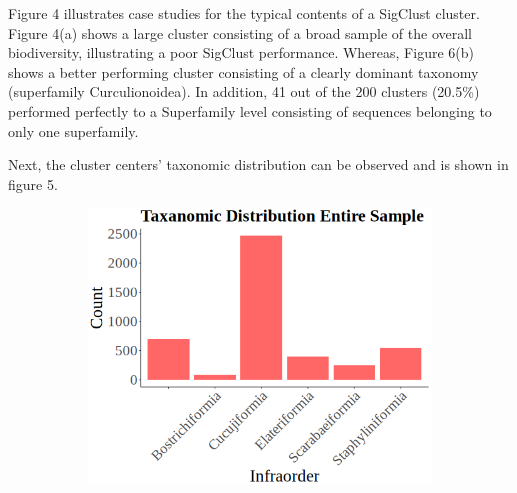 \documentclass[12pt]{article}
\begin{document}
  Figure 4 illustrates case studies for the typical contents of a SigClust cluster. Figure 4(a) shows a large cluster consisting of a broad sample of the overall biodiversity, illustrating a poor SigClust performance. Whereas, Figure 6(b) shows a better performing cluster consisting of a clearly dominant taxonomy (superfamily Curculionoidea). In addition, 41 out of the 200 clusters (20.5\%) performed perfectly to a Superfamily level consisting of sequences belonging to only one superfamily. 

  Next, the cluster centers' taxonomic distribution can be observed and is shown in figure 5. 

  \begin{figure}[H]
    \centering
    \begin{subfigure}{0.49\textwidth}
      \includegraphics[width=\linewidth]{Site100_total.png}
      \caption{}
    \end{subfigure}
    \hspace{-0.3cm} 
    \begin{subfigure}{0.51\textwidth}
\end{subfigure}
\end{figure}
\end{document}
